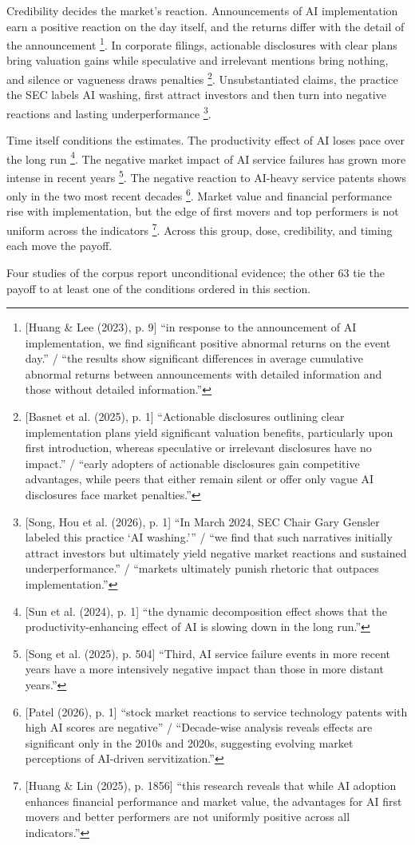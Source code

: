 Credibility decides the market's reaction. Announcements of AI implementation earn a positive reaction on the day itself, and the returns differ with the detail of the announcement \parencite[p.~9]{huang2023market}\footnote{[Huang \& Lee (2023), p. 9] ``in response to the announcement of AI implementation, we find significant positive abnormal returns on the event day.'' / ``the results show significant differences in average cumulative abnormal returns between announcements with detailed information and those without detailed information.''}. In corporate filings, actionable disclosures with clear plans bring valuation gains while speculative and irrelevant mentions bring nothing, and silence or vagueness draws penalties \parencite[p.~1]{basnet2025analyzing}\footnote{[Basnet et al. (2025), p. 1] ``Actionable disclosures outlining clear implementation plans yield significant valuation benefits, particularly upon first introduction, whereas speculative or irrelevant disclosures have no impact.'' / ``early adopters of actionable disclosures gain competitive advantages, while peers that either remain silent or offer only vague AI disclosures face market penalties.''}. Unsubstantiated claims, the practice the SEC labels AI washing, first attract investors and then turn into negative reactions and lasting underperformance \parencite[p.~1]{song2026washing}\footnote{[Song, Hou et al. (2026), p. 1] ``In March 2024, SEC Chair Gary Gensler labeled this practice `AI washing.\thinspace''' / ``we find that such narratives initially attract investors but ultimately yield negative market reactions and sustained underperformance.'' / ``markets ultimately punish rhetoric that outpaces implementation.''}.

Time itself conditions the estimates. The productivity effect of AI loses pace over the long run \parencite[p.~1]{sun2024deconstruct}\footnote{[Sun et al. (2024), p. 1] ``the dynamic decomposition effect shows that the productivity-enhancing effect of AI is slowing down in the long run.''}. The negative market impact of AI service failures has grown more intense in recent years \parencite[p.~504]{song2025companies}\footnote{[Song et al. (2025), p. 504] ``Third, AI service failure events in more recent years have a more intensively negative impact than those in more distant years.''}. The negative reaction to AI-heavy service patents shows only in the two most recent decades \parencite[p.~1]{patel2026navigating}\footnote{[Patel (2026), p. 1] ``stock market reactions to service technology patents with high AI scores are negative'' / ``Decade-wise analysis reveals effects are significant only in the 2010s and 2020s, suggesting evolving market perceptions of AI-driven servitization.''}. Market value and financial performance rise with implementation, but the edge of first movers and top performers is not uniform across the indicators \parencite[p.~1856]{huang2025firm}\footnote{[Huang \& Lin (2025), p. 1856] ``this research reveals that while AI adoption enhances financial performance and market value, the advantages for AI first movers and better performers are not uniformly positive across all indicators.''}. Across this group, dose, credibility, and timing each move the payoff.

Four studies of the corpus report unconditional evidence; the other 63 tie the payoff to at least one of the conditions ordered in this section.
